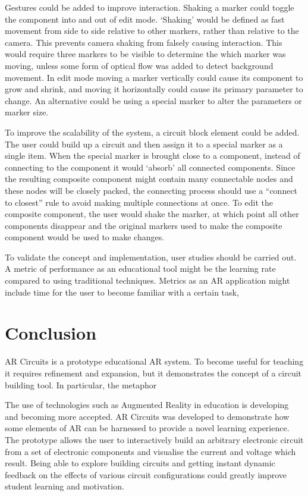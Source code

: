 Gestures could be added to improve interaction. Shaking a marker could toggle the component into and out of edit mode. `Shaking' would be defined as fast movement from side to side relative to other markers, rather than relative to the camera. This prevents camera shaking from falsely causing interaction. This would require three markers to be visible to determine the which marker was moving, unless some form of optical flow was added to detect background movement. In edit mode moving a marker vertically could cause its component to grow and shrink, and moving it horizontally could cause its primary parameter to change. An alternative could be using a special marker to alter the parameters or marker size.

To improve the scalability of the system, a circuit block element could be added. The user could build up a circuit and then assign it to a special marker as a single item. When the special marker is brought close to a component, instead of connecting to the component it would `absorb' all connected components. Since the resulting composite component might contain many connectable nodes and these nodes will be closely packed, the connecting process should use a ``connect to closest'' rule to avoid making multiple connections at once. To edit the composite component, the user would shake the marker, at which point all other components disappear and the original markers used to make the composite component would be used to make changes.

To validate the concept and implementation, user studies should be carried out. A metric of performance as an educational tool might be the learning rate compared to using traditional techniques. Metrics as an AR application might include time for the user to become familiar with a certain task,

\section{Conclusion}

AR Circuits is a prototype educational AR system. To become useful for teaching it requires refinement and expansion, but it demonstrates the concept of a circuit building tool. In particular, the metaphor

The use of technologies such as Augmented Reality in education is developing and becoming more accepted. AR Circuits was developed to demonstrate how some elements of AR can be harnessed to provide a novel learning experience. The prototype allows the user to interactively build an arbitrary electronic circuit from a set of electronic components and visualise the current and voltage which result. Being able to explore building circuits and getting instant dynamic feedback on the effects of various circuit configurations could greatly improve student learning and motivation.







